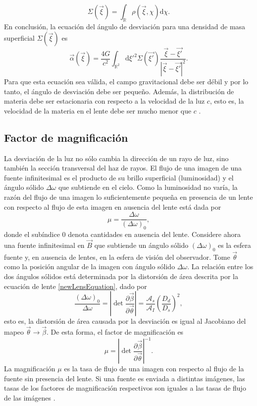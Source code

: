$$\Sigma(\vec{\xi})=\int_{\mathbb{R}} \rho(\vec{\xi},\chi)\mathrm{d}\chi.$$
En conclusión, la ecuación del ángulo de desviación para una densidad de masa superficial $\Sigma(\vec{\xi})$ es
\begin{equation}
	\vec{\alpha}(\vec{\xi})=\frac{4G}{c^2}\int_{\mathbb{R}^2}\mathrm{d}{\xi'}^2 \Sigma(\vec{\xi'})\frac{\vec{\xi}-\vec{\xi'}}{|\vec{\xi}-\vec{\xi'}|^2}.
\end{equation}
Para que esta ecuación sea válida, el campo gravitacional debe ser débil y por lo tanto, el ángulo de desviación debe ser pequeño. Además, la distribución de materia debe ser estacionaria con respecto a la velocidad de la luz $c$, esto es, la velocidad de la materia en el lente debe ser mucho menor que $c$ \cite{schneider_ehlers_falco_1992}. 
\subsection{Factor de magnificación}
La desviación de la luz no sólo cambia la dirección de un rayo de luz, sino también la sección transversal del haz de rayos. El flujo de una imagen de una fuente infinitesimal es el producto de su brillo superficial (luminosidad) y el ángulo sólido $\Delta \omega$ que subtiende en el cielo. Como la luminosidad no varía, la razón del flujo de una imagen lo suficientemente pequeña en presencia de un lente con respecto al flujo de esta imagen en ausencia del lente está dada por
\begin{equation}
	\mu = \frac{\Delta \omega}{(\Delta \omega)_0},
\end{equation}
donde el subíndice $0$ denota cantidades en ausencia del lente.
Considere ahora una fuente infinitesimal en $\vec{B}$ que subtiende un ángulo sólido $(\Delta\omega)_0$ es la esfera fuente y, en ausencia de lentes, en la esfera de visión del observador. Tome $\vec{\theta}$ como la posición angular de la imagen con ángulo sólido $\Delta\omega$. La relación entre los dos ángulos sólidos está determinada por la distorsión de área descrita por la ecuación de lente \eqref{newLensEquation}, dado por
\begin{equation}
\frac{(\Delta\omega)_0}{\Delta\omega}=\left|\mathop{det}\frac{\partial \vec{\beta}}{\partial \vec{\theta}}\right|=\frac{\mathcal{A}_s}{\mathcal{A}_I}\left(\frac{D_d}{D_s}\right)^2,
\end{equation}
esto es, la distorsión de área causada por la desviación es igual al Jacobiano del mapeo $\vec{\theta}\rightarrow\vec{\beta}$. De esta forma, el factor de magnificación es
\begin{equation}
\mu = \left|\mathop{det}\frac{\partial\vec{\beta}}{\partial\vec{\theta}} \right|^{-1}.
\end{equation}
La magnificación $\mu$ es la tasa de flujo de una imagen con respecto al flujo de la fuente sin presencia del lente. Si una fuente es enviada a distintas imágenes, las tasas de los factores de magnificación respectivos son iguales a las tasas de flujo de las imágenes \cite{schneider_ehlers_falco_1992}.
